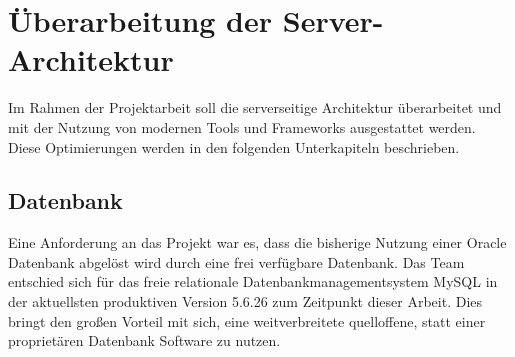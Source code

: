 \section{Überarbeitung der Server-Architektur}
	Im Rahmen der Projektarbeit soll die serverseitige Architektur überarbeitet
	und mit der Nutzung von modernen Tools und Frameworks ausgestattet werden.
	Diese Optimierungen werden in den folgenden Unterkapiteln beschrieben.
	
	\subsection{Datenbank}
		Eine Anforderung an das Projekt war es, dass die bisherige Nutzung einer
		Oracle Datenbank abgelöst wird durch eine frei verfügbare Datenbank. Das Team
		entschied sich für das freie relationale Datenbankmanagementsystem MySQL in
		der aktuellsten produktiven Version 5.6.26 zum Zeitpunkt dieser Arbeit.
		Dies bringt den großen Vorteil mit sich, eine weitverbreitete quelloffene, statt
		einer proprietären Datenbank Software zu nutzen.
		
